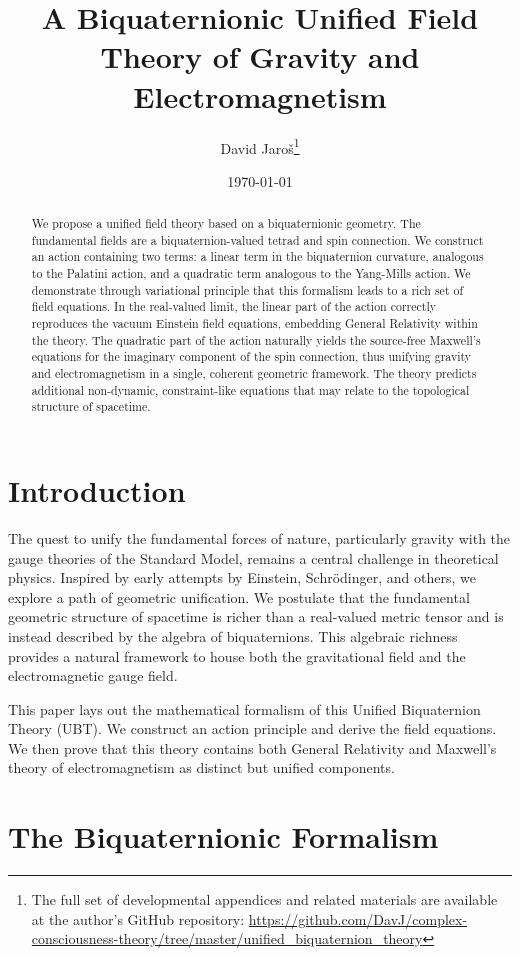 \documentclass[11pt, a4paper]{article}
\title{\textbf{A Biquaternionic Unified Field Theory of Gravity and Electromagnetism}}
\author{David Jaroš\thanks{The full set of developmental appendices and related materials are available at the author's GitHub repository: \url{https://github.com/DavJ/complex-consciousness-theory/tree/master/unified_biquaternion_theory}}}
\affil{Independent Researcher}
\date{\today}
\begin{document}
\maketitle

\begin{abstract}
We propose a unified field theory based on a biquaternionic geometry. The fundamental fields are a biquaternion-valued tetrad and spin connection. We construct an action containing two terms: a linear term in the biquaternion curvature, analogous to the Palatini action, and a quadratic term analogous to the Yang-Mills action. We demonstrate through variational principle that this formalism leads to a rich set of field equations. In the real-valued limit, the linear part of the action correctly reproduces the vacuum Einstein field equations, embedding General Relativity within the theory. The quadratic part of the action naturally yields the source-free Maxwell's equations for the imaginary component of the spin connection, thus unifying gravity and electromagnetism in a single, coherent geometric framework. The theory predicts additional non-dynamic, constraint-like equations that may relate to the topological structure of spacetime.
\end{abstract}

\tableofcontents

\section{Introduction}
The quest to unify the fundamental forces of nature, particularly gravity with the gauge theories of the Standard Model, remains a central challenge in theoretical physics. Inspired by early attempts by Einstein, Schrödinger, and others, we explore a path of geometric unification. We postulate that the fundamental geometric structure of spacetime is richer than a real-valued metric tensor and is instead described by the algebra of biquaternions. This algebraic richness provides a natural framework to house both the gravitational field and the electromagnetic gauge field.

This paper lays out the mathematical formalism of this Unified Biquaternion Theory (UBT). We construct an action principle and derive the field equations. We then prove that this theory contains both General Relativity and Maxwell's theory of electromagnetism as distinct but unified components.

\section{The Biquaternionic Formalism}
\end{document}
